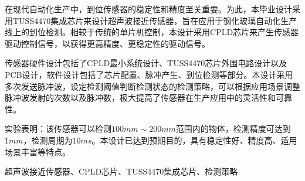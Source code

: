 \begin{ZhAbstract}
    在现代自动化生产中，到位传感器的稳定性和精度至关重要。为此，本毕业设计采用TUSS4470集成芯片来设计超声波接近传感器，旨在应用于钢化玻璃自动化生产线上的到位检测。相较于传统的单片机控制，本设计采用CPLD芯片来产生传感器驱动控制信号，以获得更高精度、更稳定性的驱动信号。\par
    传感器硬件设计包括了CPLD最小系统设计、TUSS4470芯片外围电路设计以及PCB设计，软件设计包括了芯片配置、脉冲产生、到位检测等部分。本设计采用多次发送脉冲波，设定检测阈值判断检测状态的检测策略，可以根据应用场景调整脉冲波发射的次数以及脉冲数，极大提高了传感器在生产应用中的灵活性和可靠性。\par
    实验表明：该传感器可以检测$100mm\sim200mm$范围内的物体，检测精度可达到$1mm$，检测周期为$10ms$。本设计已达到预期目的，具有稳定性好、精度高、适用场景丰富等特点。
    
    \ChineseKeyWord 超声波接近传感器、CPLD芯片、TUSS4470集成芯片、检测策略
    
\end{ZhAbstract}